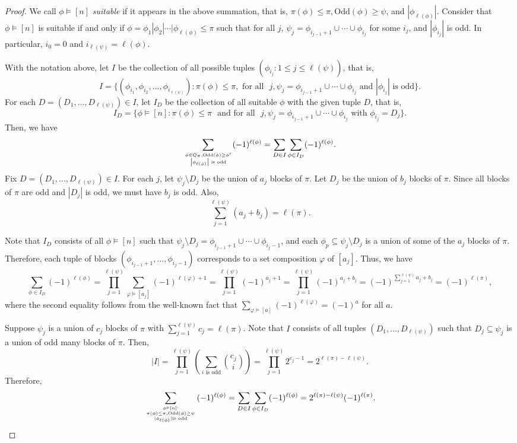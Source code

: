 \documentclass[11pt]{amsart}
\numberwithin{equation}{section}
\newcommand{\odd}{\mathrm{Odd}}
\begin{document}
\begin{proof}
We call $\phi\vDash[n]$ \emph{suitable} if  it appears in the above summation, that is, $\pi(\phi)\leq \pi,\odd(\phi)\geq\psi$, and  $|\phi_{\ell(\phi)}|$. Consider that $\phi\vDash[n]$ is suitable  if and only if $\phi=\phi_1|\phi_2|\cdots|\phi_{\ell(\phi)}\leq \pi$ such that for all $j$, $\psi_j=\phi_{i_{j-1}+1}\cup \cdots \cup \phi_{i_j}$ for some $i_j$,  and $|\phi_{i_j}|$ is odd. In particular, $i_0=0$ and $i_{\ell(\psi)}=\ell(\phi)$. 

With the notation above, let $I$ be the collection of all possible tuples $(\phi_{i_j}:1\leq j\leq \ell(\psi))$, that is,
	$$I=\{(\phi_{i_1},\phi_{i_2},\dots,\phi_{i_{\ell(\psi)}}):\pi(\phi)\leq \pi,\text{ for all ~}j, \psi_j=\phi_{i_{j-1}+1}\cup\cdots\cup \phi_{i_j}\text{ and }|\phi_{i_j}|\text{ is odd}\}.$$
	For each $D=(D_1,\dots,D_{\ell(\psi)})\in I$, let $I_D$ be the collection of all suitable $\phi$ with the given tuple $D$, that is, 
	$$I_D=\{\phi\vDash [n]:\pi(\phi)\leq \pi \text{~ and for all ~}j, \psi_j=\phi_{i_{j-1}+1}\cup\cdots\cup \phi_{i_j}\text{ with }\phi_{i_j}=D_j\}.$$
	Then, we have
	$$\sum_{\phi\in Q_\pi,\odd(\phi)\geq\phi' \atop \left|\phi_{\ell(\phi)}\right|\text{ is odd}}(-1)^{\ell(\phi)}=\sum_{D\in I}\sum_{\phi\in I_D}(-1)^{\ell(\phi)}.$$	
	Fix $D=(D_1,\dots,D_{\ell(\psi)})\in I$. For each $j$, let $\psi_j\setminus D_j$ be the union of $a_j$ blocks of $\pi$. Let $D_j$ be the union of $b_j$ blocks of $\pi$. Since all blocks of $\pi$ are odd and $|D_j|$ is odd, we must have $b_j$ is odd. Also,
	$$\sum_{j=1}^{\ell(\psi)}(a_j+b_j)=\ell(\pi).$$
	
	Note that $I_D$ consists of all $\phi\vDash[n]$ such that $\psi_j\setminus D_j=\phi_{i_{j-1}+1}\cup\cdots\cup \phi_{i_j-1}$, and each $\phi_p\subseteq \psi_j\setminus D_j$ is a union of some of the $a_j$ blocks of $\pi$. Therefore, each tuple of blocks $(\phi_{i_{j-1}+1},\dots, \phi_{i_j-1})$ corresponds to a set composition $\varphi$ of $[a_j]$. Thus, we have
	$$\sum_{\phi\in I_D}(-1)^{\ell(\phi)}=\prod_{j=1}^{\ell(\psi)}\sum_{\varphi\models[a_j]}(-1)^{\ell(\varphi)+1}=\prod_{j=1}^{\ell(\psi)}(-1)^{a_j+1}=\prod_{j=1}^{\ell(\psi)}(-1)^{a_j+b_j}=(-1)^{\sum_{j=1}^{\ell(\psi)}a_j+b_j}=(-1)^{\ell(\pi)},$$ where
	the second equality follows from the well-known fact that $\sum_{\varphi\vDash[a]}(-1)^{\ell(\varphi)}=(-1)^{a}$ for all $a$. 
		
	Suppose $\psi_j$ is a union of $c_j$ blocks of $\pi$ with $\sum_{j=1}^{\ell(\psi)} c_j=\ell(\pi)$. Note that $I$ consists of all tuples $(D_1,\dots,D_{\ell(\psi)})$ such that $D_j\subseteq \psi_j$ is a union of odd many blocks of $\pi$. Then,
	$$|I|=\prod_{j=1}^{\ell(\psi)}\left(\sum_{i\text{ is odd}}\binom{c_j}{i}\right)=\prod_{j=1}^{\ell(\psi)}2^{c_j-1}=2^{\ell(\pi)-\ell(\psi)}.$$
	Therefore, 
	$$\displaystyle\sum_{\phi\vDash[n]: \atop{ \pi(\phi)\leq \pi,\odd(\phi)\geq\psi \atop |\phi_{\ell(\phi)}|\text{is odd}}}(-1)^{\ell(\phi)}=\sum_{D\in I}\sum_{\phi\in I_D}(-1)^{\ell(\phi)}=2^{\ell(\pi)-\ell(\psi)}(-1)^{\ell(\pi)}.$$
\end{proof}
\end{document}
